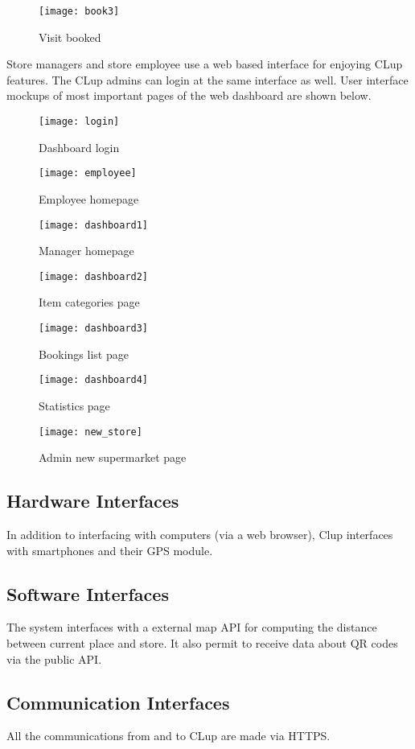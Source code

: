 \clearpage

\begin{figure}[H]
	\centering
	\texttt{[image: book3]}
	\caption{Visit booked}	
\end{figure} 

Store managers and store employee use a web based interface for enjoying CLup features. The CLup admins can login at the same interface as well.
User interface mockups of most important pages of the web dashboard are shown below.
\vspace{2em}
\begin{figure}[H]
	\centering
	\texttt{[image: login]}
	\caption{Dashboard login}	
\end{figure} 

\begin{figure}[H]
	\centering
	\texttt{[image: employee]}
	\caption{Employee homepage}	
\end{figure} 
\begin{figure}[H]
	\centering
	\texttt{[image: dashboard1]}
	\caption{Manager homepage}	
\end{figure} 
\begin{figure}[H]
	\centering
	\texttt{[image: dashboard2]}
	\caption{Item categories page}	
\end{figure} 
\begin{figure}[H]
	\centering
	\texttt{[image: dashboard3]}
	\caption{Bookings list page}	
\end{figure} 
\begin{figure}[H]
	\centering
	\texttt{[image: dashboard4]}
	\caption{Statistics page}	
\end{figure} 
\begin{figure}[H]
	\centering
	\texttt{[image: new\_store]}
	\caption{Admin new supermarket page}	
\end{figure} 
\clearpage

\subsection{Hardware Interfaces}
In addition to interfacing with computers (via a web browser), Clup interfaces with smartphones and their GPS module.
\subsection{Software Interfaces}
The system interfaces with a external map API for computing the distance between current place and store. It also permit to receive data
about QR codes via the public API.
\subsection{Communication Interfaces}
All the communications from and to CLup are made via HTTPS.
